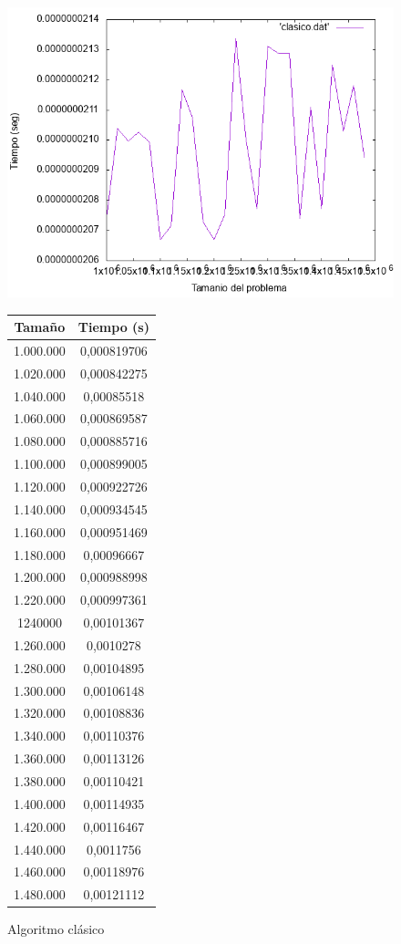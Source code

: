 \documentclass[12pt,spanish]{article}
\begin{document}
\begin{figure}[H]
\centering

\includegraphics[scale=0.75]{clasico.png}
\vskip 0.5cm

\begin{tabular}{|c|c|}
\hline
\textbf{Tamaño} & \textbf{Tiempo (s)} \\
\hline
1.000.000 & 0,000819706\\
\hline
1.020.000 & 0,000842275\\
\hline
1.040.000 & 0,00085518\\
\hline
1.060.000 & 0,000869587\\
\hline
1.080.000 & 0,000885716\\
\hline
1.100.000 & 0,000899005\\
\hline
1.120.000 & 0,000922726\\
\hline
1.140.000 & 0,000934545\\
\hline
1.160.000 & 0,000951469\\
\hline
1.180.000 & 0,00096667\\
\hline
1.200.000 & 0,000988998\\
\hline
1.220.000 & 0,000997361\\
\hline
1240000 & 0,00101367\\
\hline
1.260.000 & 0,0010278\\
\hline
1.280.000 & 0,00104895\\
\hline
1.300.000 & 0,00106148\\
\hline
1.320.000 & 0,00108836\\
\hline
1.340.000 & 0,00110376\\
\hline
1.360.000 & 0,00113126\\
\hline
1.380.000 & 0,00110421\\
\hline
1.400.000 & 0,00114935\\
\hline
1.420.000 & 0,00116467\\
\hline
1.440.000 & 0,0011756\\
\hline
1.460.000 & 0,00118976\\
\hline
1.480.000 & 0,00121112\\
\hline

\end{tabular}


\caption{Algoritmo clásico}
\end{figure}
\end{document}
